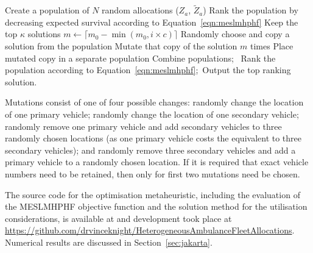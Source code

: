 \documentclass[numbers,webpdf,imaman]{ima-authoring-template}%
\begin{document}
\begin{algorithm}
\algnewcommand{}
\caption{Evolutionary Algorithm used to find better allocations.}
\label{alg:heuristic}
\begin{algorithmic}[1]
\State Create a population of $N$ random allocations ($Z_a$, $\tilde{Z}_a$)\;
  \State Rank the population by decreasing expected survival according to Equation~\ref{eqn:meslmhphf}\;
  \State Keep the top $\kappa$ solutions\;
  \State $m \leftarrow \lceil m_0 - \min\left(m_0, i \times c\right)\rceil$\;
    \State Randomly choose and copy a solution from the population\;
    \State Mutate that copy of the solution $m$ times\;
    \State Place mutated copy in a separate population\;
  \EndFor
  \State Combine populations;\
\EndFor
\State Rank the population according to Equation~\ref{eqn:meslmhphf};\
\State Output the top ranking solution.
\end{algorithmic}
\end{algorithm}

Mutations consist of one of four possible changes: randomly change the location
of one primary vehicle; randomly change the location of one secondary vehicle;
randomly remove one primary vehicle and add secondary vehicles to three randomly
chosen locations (as one primary vehicle costs the equivalent to three secondary
vehicles); and randomly remove three secondary vehicles and add a primary
vehicle to a randomly chosen location. If it is required that exact vehicle
numbers need to be retained, then only for first two mutations need be chosen.

The source code for the optimisation metaheuristic, including the evaluation of
the MESLMHPHF objective function and the solution method for the utilisation
considerations, is available at \citet{zenodo_opt} and development took place at
\url{https://github.com/drvinceknight/HeterogeneousAmbulanceFleetAllocations}.
Numerical results are discussed in Section~\ref{sec:jakarta}.
\end{document}
